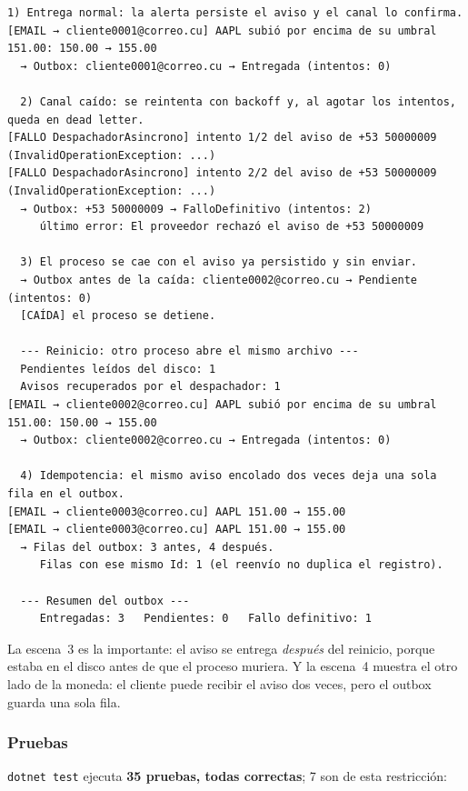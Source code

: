 \begin{lstlisting}[language={}, numbers=none, basicstyle=\ttfamily\scriptsize, columns=fullflexible, keepspaces=true, breaklines=true]
  1) Entrega normal: la alerta persiste el aviso y el canal lo confirma.
[EMAIL → cliente0001@correo.cu] AAPL subió por encima de su umbral 151.00: 150.00 → 155.00
  → Outbox: cliente0001@correo.cu → Entregada (intentos: 0)

  2) Canal caído: se reintenta con backoff y, al agotar los intentos, queda en dead letter.
[FALLO DespachadorAsincrono] intento 1/2 del aviso de +53 50000009 (InvalidOperationException: ...)
[FALLO DespachadorAsincrono] intento 2/2 del aviso de +53 50000009 (InvalidOperationException: ...)
  → Outbox: +53 50000009 → FalloDefinitivo (intentos: 2)
     último error: El proveedor rechazó el aviso de +53 50000009

  3) El proceso se cae con el aviso ya persistido y sin enviar.
  → Outbox antes de la caída: cliente0002@correo.cu → Pendiente (intentos: 0)
  [CAÍDA] el proceso se detiene.

  --- Reinicio: otro proceso abre el mismo archivo ---
  Pendientes leídos del disco: 1
  Avisos recuperados por el despachador: 1
[EMAIL → cliente0002@correo.cu] AAPL subió por encima de su umbral 151.00: 150.00 → 155.00
  → Outbox: cliente0002@correo.cu → Entregada (intentos: 0)

  4) Idempotencia: el mismo aviso encolado dos veces deja una sola fila en el outbox.
[EMAIL → cliente0003@correo.cu] AAPL 151.00 → 155.00
[EMAIL → cliente0003@correo.cu] AAPL 151.00 → 155.00
  → Filas del outbox: 3 antes, 4 después.
     Filas con ese mismo Id: 1 (el reenvío no duplica el registro).

  --- Resumen del outbox ---
     Entregadas: 3   Pendientes: 0   Fallo definitivo: 1
\end{lstlisting}

La escena~3 es la importante: el aviso se entrega \emph{después} del reinicio, porque estaba en el
disco antes de que el proceso muriera. Y la escena~4 muestra el otro lado de la moneda: el cliente
puede recibir el aviso dos veces, pero el outbox guarda una sola fila.

\subsubsection{Pruebas}

\texttt{dotnet test} ejecuta \textbf{35 pruebas, todas correctas}; 7 son de esta restricción:

